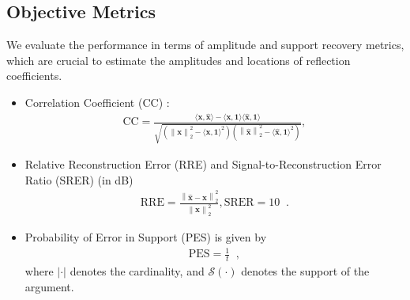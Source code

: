 \documentclass[journal]{IEEEtran}
\begin{document}
\subsection{Objective Metrics}
\label{metrics}
We evaluate the performance in terms of amplitude and support recovery metrics, which are crucial to estimate the amplitudes and locations of reflection coefficients.

\begin{itemize}[wide, labelwidth=0pt, labelindent=0pt, noitemsep, nolistsep]
    \item {Correlation Coefficient (CC) \cite{freedman2007statistics}:
    \begin{align*}
        \text{CC} = \frac{\langle {\boldsymbol{x}}, \hat{{\boldsymbol{x}}} \rangle - \langle {\boldsymbol{x}}, {{\boldsymbol{1}}} \rangle \langle \hat{{\boldsymbol{x}}}, {{\boldsymbol{1}}} \rangle}{\sqrt{\left( \left\| {{\boldsymbol{x}}} \right\|_2^2 - {\langle {\boldsymbol{x}}, {{\boldsymbol{1}}} \rangle}^2 \right) \left( \left\| \hat{{\boldsymbol{x}}} \right\|_2^2 - {\langle \hat{{\boldsymbol{x}}}, {{\boldsymbol{1}}} \rangle}^2 \right) }},
    \end{align*}%
    }
    \item Relative Reconstruction Error (RRE) and Signal-to-Reconstruction Error Ratio (SRER) (in dB)%
    \begin{align*}%
        \text{RRE} = \frac{{\left\| \hat{\boldsymbol{x}} - \boldsymbol{x} \right\|}_2^2}{{\left\| \boldsymbol{x} \right\|}_2^2}, \text{SRER} = 10\mathop {\log\limits_{10} \left(\frac{{\left\| {\boldsymbol{x}} \right\|_2^2}}{{\left\| {\hat{\boldsymbol{x}} - {\boldsymbol{x}}} \right\|_2^2}}\right)}.
    \end{align*}
    \item {Probability of Error in Support (PES) is given by%
    \begin{align*}
        \text{PES} = \frac{1}{t} \mathop{ \sum\limits_{i = 1}^t \left( \frac{{{\text{max}}(\left| {\mathcal{S}({\hat{\boldsymbol{x}_i}})} \right|,\left| {\mathcal{S}({\boldsymbol{x}_i})} \right|) - \left| {\mathcal{S}({\hat{\boldsymbol{x}_i}})\mathop {\cap} {\mathcal{S}}({\boldsymbol{x}_i})} \right|}}{{{\text{max}}(\left| {\mathcal{S}({\hat{\boldsymbol{x}_i}})} \right|,\left| {\mathcal{S}({\boldsymbol{x}_i})} \right|)}}\right)}, 
    \end{align*}%
    where $|\cdot|$ denotes the cardinality, and $\mathcal{S}(\cdot)$ denotes the support of the argument.}
\end{itemize}%
\end{document}
